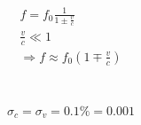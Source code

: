 \section{}
\begin{align*}
f=f_0\frac{1}{1\pm\frac{v}{c}} \\
\frac{v}{c} \ll 1 \\
\Rightarrow f\approx f_0(1\mp \frac{v}{c})
\end{align*}
\section{}
\begin{align*}
\sigma_c=\sigma_v=0.1 \% =0.001
\end{align*}